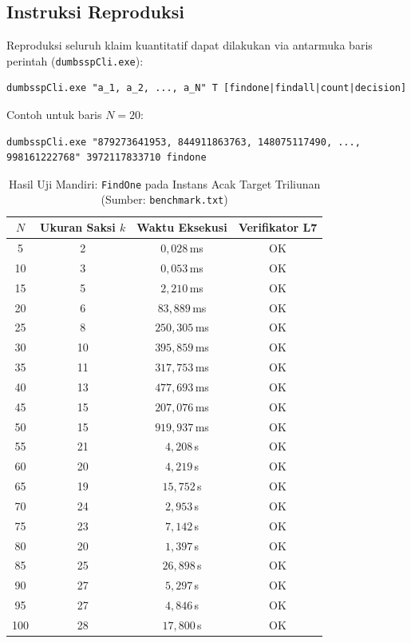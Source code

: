 \documentclass[journal,onecolumn,11pt]{IEEEtran}
\begin{document}
\subsection{Instruksi Reproduksi}
\label{sec:repro}
Reproduksi seluruh klaim kuantitatif dapat dilakukan via antarmuka baris perintah (\texttt{dumbsspCli.exe}):
\begin{verbatim}
dumbsspCli.exe "a_1, a_2, ..., a_N" T [findone|findall|count|decision]
\end{verbatim}
Contoh untuk baris $N=20$:
\begin{verbatim}
dumbsspCli.exe "879273641953, 844911863763, 148075117490, ...,
998161222768" 3972117833710 findone
\end{verbatim}

\begin{table}[h]
\centering
\caption{Hasil Uji Mandiri: \texttt{FindOne} pada Instans Acak Target Triliunan (Sumber: \texttt{benchmark.txt})}
\label{tab:selftest}
\renewcommand{\arraystretch}{1.1}
\begin{tabular}{cccc}
\hline
$N$ & Ukuran Saksi $k$ & Waktu Eksekusi & Verifikator L7 \\
\hline
5   & 2  & $0{,}028$\,ms  & OK \\
10  & 3  & $0{,}053$\,ms  & OK \\
15  & 5  & $2{,}210$\,ms  & OK \\
20  & 6  & $83{,}889$\,ms & OK \\
25  & 8  & $250{,}305$\,ms & OK \\
30  & 10 & $395{,}859$\,ms & OK \\
35  & 11 & $317{,}753$\,ms & OK \\
40  & 13 & $477{,}693$\,ms & OK \\
45  & 15 & $207{,}076$\,ms & OK \\
50  & 15 & $919{,}937$\,ms & OK \\
55  & 21 & $4{,}208$\,s   & OK \\
60  & 20 & $4{,}219$\,s   & OK \\
65  & 19 & $15{,}752$\,s  & OK \\
70  & 24 & $2{,}953$\,s   & OK \\
75  & 23 & $7{,}142$\,s   & OK \\
80  & 20 & $1{,}397$\,s   & OK \\
85  & 25 & $26{,}898$\,s  & OK \\
90  & 27 & $5{,}297$\,s   & OK \\
95  & 27 & $4{,}846$\,s   & OK \\
100 & 28 & $17{,}800$\,s  & OK \\
\hline
\end{tabular}
\end{table}
\end{document}

